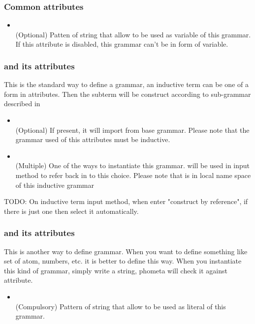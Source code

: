 \documentclass[11pt, a4paper]{article}
\begin{document}
\subsubsection{Common attributes}

\begin{itemize}
    \item \kVarRegex {} \\
    (Optional) Patten of string that allow to be used as variable of this grammar. If this attribute is disabled, this grammar can't be in form of variable.
\end{itemize}

\subsubsection{\kInductive and its attributes}
This is the standard way to define a grammar, an inductive term can be one of a form in \kChoice attributes. Then the subterm will be construct according to sub-grammar described in \kChoice 
\begin{itemize}
    \item \kExtend {} \\
    (Optional) If present, it will import \kChoice from base grammar. Please note that the grammar used of this attributes must be inductive.
    \item \kChoice {} \kRef {} \\
    (Multiple) One of the ways to instantiate this grammar.  will be used in input method to refer back in to this choice. Please note that  is in local name space of this inductive grammar
\end{itemize}

  TODO: On inductive term input method, when enter "construct by reference", if there is just one \kChoice then select it automatically.

\subsubsection{\kLiteral and its attributes}
This is another way to define grammar. When you want to define something like set of atom, numbers, etc. it is better to define this way. When you instantiate this kind of grammar, simply write a string, phometa will check it against \kRegex attribute.
\begin{itemize}
    \item \kRegex {} \\
    (Compulsory) Pattern of string that allow to be used as literal of this grammar.
\end{itemize}
\end{document}
